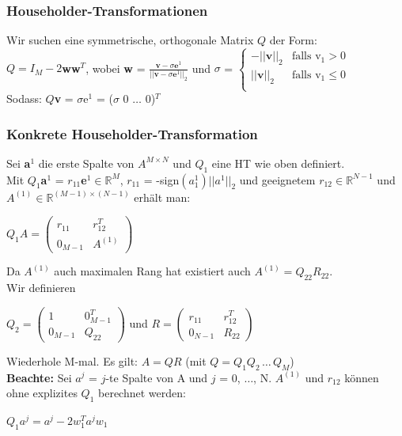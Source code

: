 \documentclass[a4paper, 14pt]{article}
\begin{document}
    \subsubsection{Householder-Transformationen}
    Wir suchen eine symmetrische, orthogonale Matrix $Q$ der Form:\\
    $Q = I_M - 2$\textbf{ww}$^T$, wobei \textbf{w} = $\frac{\textbf{v} - \sigma \textbf{e}^1}{||\textbf{v} - \sigma
    \textbf{e}^1||_2}$ und $\sigma$ =
    $\begin{cases}
         -||\textbf{v}||_2 & \text{falls v}_1 > 0\\
         ||\textbf{v}||_2 & \text{falls v}_1 \leq 0\\
    \end{cases}$\\
    Sodass: $Q$\textbf{v} = $\sigma$e$^1$ = ($\sigma$ 0 $\hdots$ 0)$^T$\\

    \subsubsection{Konkrete Householder-Transformation}
    Sei \textbf{a}$^1$ die erste Spalte von $A^{M\times N}$ und $Q_1$ eine HT wie oben definiert.\\
    Mit $Q_1$\textbf{a}$^1$ = $r_{11}$\textbf{e}$^1\in\mathds{R}^M$, $r_{11}$ = -sign$(a_1^1)||a^1||_2$ und
    geeignetem $r_{12}\in\mathds{R}^{N-1}$ und $A^{(1)}\in\mathds{R}^{(M-1)\times (N-1)}$ erh\"alt man:
    \begin{center}
        $Q_1A = \begin{pmatrix}r_{11} & r_{12}^T\\ 0_{M-1} & A^{(1)}\end{pmatrix}$
    \end{center}
    Da $A^{(1)}$ auch maximalen Rang hat existiert auch $A^{(1)} = Q_{22}R_{22}$.\\
    Wir definieren
    \begin{center}
        $Q_2 = \begin{pmatrix}1 & 0_{M-1}^T\\ 0_{M-1} & Q_{22}\end{pmatrix}$ und
        $R = \begin{pmatrix}r_{11} & r_{12}^T\\ 0_{N-1} & R_{22}\end{pmatrix}$
    \end{center}
    Wiederhole M-mal. Es gilt: $A = QR$ (mit $Q = Q_1 Q_2\,\hdots\,Q_M$)\\
    \newline
    \textbf{Beachte:} Sei $a^j$ = $j$-te Spalte von A und $j$ = 0, $\hdots$, N. $A^{(1)}$ und $r_{12}$ k\"onnen ohne
    explizites $Q_1$ berechnet werden:
    \begin{center}
        $Q_1 a^j = a^j - 2w_1^T a^j w_1$
    \end{center}
\end{document}
